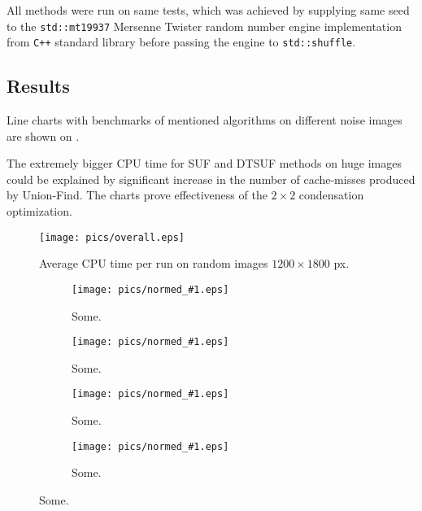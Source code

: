 \documentclass[hidelinks]{llncs}
\newcommand{\CXX}{\texttt{C++} \xspace}
\begin{document}
All methods were run on same tests, which was achieved by supplying same seed to the
\texttt{std::mt19937} Mersenne Twister\cite{mt19937} random number engine implementation from \CXX standard library before passing the engine to \texttt{std::shuffle}.

\subsection{Results}

Line charts with benchmarks of mentioned algorithms on different noise images
are shown on
.

The extremely bigger CPU time for SUF and DTSUF methods on huge images could be
explained by significant increase in the number of cache-misses produced by
Union-Find. The charts prove effectiveness of the $2 \times 2$ condensation
optimization.

\begin{figure}
  \centering
  \texttt{[image: pics/overall.eps]}
  \caption{Average CPU time per run on random images $1200 \times 1800$ px.}
  \label{fig:overall:times}
\end{figure}

\newcommand{\inputnorm}[1]{
  \begin{subfigure}[t]{0.45\linewidth}
    \centering
    \texttt{[image: pics/normed\_\#1.eps]}
    \caption{Some.}
    \label{fig:normed:#1}
  \end{subfigure}
}

\begin{figure}
  \centering
  \inputnorm{DFS}
  \inputnorm{SUF}
  \inputnorm{SUF2}
  \inputnorm{DTSUF}
  \label{fig:normed}
\end{figure}

\end{document}
